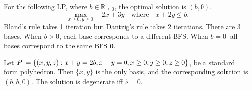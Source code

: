 \documentclass[a4paper,12pt,fleqn]{article}
\begin{document}
\begin{example}
For the following LP, where $b \in \mathbb{R}_{\ge 0}$, the optimal solution is $(b, 0)$.
\[ \max_{x \ge 0, y \ge 0}\quad 2x+3y \quad\textrm{where}\quad x + 2y \le b. \]
Bland's rule takes 1 iteration but Dantzig's rule takes 2 iterations.
There are 3 bases. When $b > 0$, each base corresponds to a different BFS.
When $b = 0$, all bases correspond to the same BFS $\mathbf{0}$.
\end{example}

\begin{example}
Let $P := \{(x, y, z): x + y = 2b, x - y = 0, x \ge 0, y \ge 0, z \ge 0\}$,
be a standard form polyhedron. Then $\{x, y\}$ is the only basis,
and the corresponding solution is $(b,b,0)$.
The solution is degenerate iff $b = 0$.
\end{example}

\end{document}
